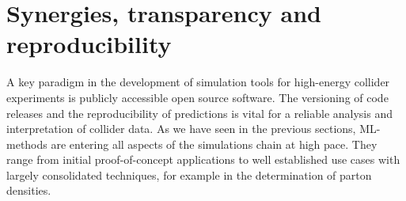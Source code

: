 \documentclass[submission,Phys]{SciPost}
\begin{document}
%
%

\section{Synergies, transparency and reproducibility}

A key paradigm in the development of simulation tools for high-energy collider experiments
is publicly accessible open source software. The versioning of code releases and the reproducibility of predictions is vital for a reliable analysis and interpretation of collider data. As we have seen in the previous sections, ML-methods are entering all aspects of the simulations chain at high pace. They range from initial proof-of-concept applications to well established use cases with largely consolidated techniques, for example in the determination of parton densities.
\end{document}
